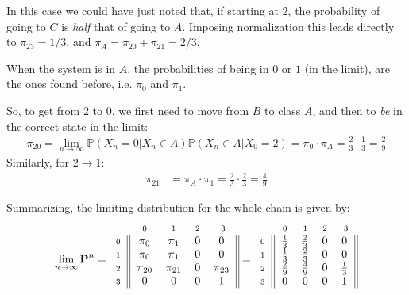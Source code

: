 \documentclass[../template.tex]{subfiles}
\begin{document}
\begin{itemize}
    In this case we could have just noted that, if starting at $2$, the probability of going to $C$ is \textit{half} that of going to $A$. Imposing normalization this leads directly to $\pi_{23} = 1/3$, and $\pi_A = \pi_{20} + \pi_{21} = 2/3$.

    When the system is in $A$, the probabilities of being in $0$ or $1$ (in the limit), are the ones found before, i.e. $\pi_0$ and $\pi_1$.

    So, to get from $2$ to $0$, we first need to move from $B$ to class $A$, and then to \textit{be} in the correct state in the limit: 
    \begin{align*}
        \pi_{20} = \lim_{n \to \infty} \mathbb{P}(X_n = 0|X_n \in A) \mathbb{P}(X_n \in A|X_0 = 2) = \pi_0 \cdot \pi_A = \frac{2}{3} \cdot \frac{1}{3} = \frac{2}{9}
    \end{align*}
    Similarly, for $2 \to 1$:
    \begin{align*}
        \pi_{21} &= \pi_A \cdot \pi_1 = \frac{2}{3} \cdot \frac{2}{3} = \frac{4}{9}
    \end{align*}
\end{itemize}

Summarizing, the limiting distribution for the whole chain is given by:
\begin{align*}
    \lim_{n \to \infty} \textbf{P}^n =  \begin{blockarray}{l*{4}{c}}
        \begin{block}{l*{4}{>{\scriptstyle}c<{}}}
            & 0 & 1 & 2 & 3\\
        \end{block}
        \begin{block}{>{\scriptstyle}r<{}||*{4}{c}||}
            0 & \pi_0  & \pi_1  & 0 & 0\\
            1 & \pi_0  & \pi_1  & 0 & 0\\
            2 & \pi_{20}  & \pi_{21}  & 0  & \pi_{23} \\
            3 & 0 & 0 & 0 & 1 \\
        \end{block}
    \end{blockarray} = 
    \begin{blockarray}{l*{4}{c}}
        \begin{block}{l*{4}{>{\scriptstyle}c<{}}}
            & 0 & 1 & 2 & 3\\
        \end{block}
        \begin{block}{>{\scriptstyle}r<{}||*{4}{c}||}
            0 & \frac{1}{3}  & \frac{2}{3}  & 0 & 0\\
            1 & \frac{1}{3}  & \frac{2}{3}  & 0 & 0\\
            2 & \frac{2}{9}  & \frac{4}{9}  & 0  & \frac{1}{3} \\
            3 & 0 & 0 & 0 & 1 \\
        \end{block}
    \end{blockarray}
\end{align*}
\end{document}
